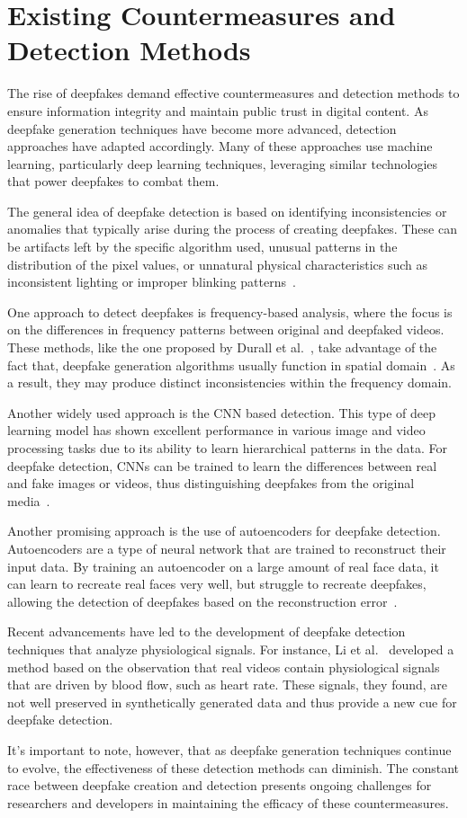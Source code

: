 \section{Existing Countermeasures and Detection Methods}\label{chapter:countermeasures}
The rise of deepfakes demand effective countermeasures and detection methods
to ensure information integrity and maintain public trust
in digital content. As deepfake generation techniques have become more advanced,
detection approaches have adapted accordingly. Many of these
approaches use machine learning, particularly deep learning techniques,
leveraging similar technologies that power deepfakes to combat them.

The general idea of deepfake detection is based on identifying inconsistencies
or anomalies that typically arise during the process of creating deepfakes. These
can be artifacts left by the specific algorithm used, unusual patterns in the
distribution of the pixel values, or unnatural physical characteristics
such as inconsistent lighting or improper blinking patterns~\cite{Agarwal_2019_CVPR_Workshops}.

One approach to detect deepfakes is frequency-based analysis, where the focus is
on the differences in frequency patterns between original and deepfaked videos.
These methods, like the one proposed by Durall et al.~\cite{durall2020unmasking},
take advantage of the fact that, deepfake generation algorithms usually function in
spatial domain~\cite{spatial-domain}. As a result, they may produce distinct inconsistencies
within the frequency domain.

Another widely used approach is the \ac{CNN} based detection. This type of deep
learning model has shown excellent performance in various image and video
processing tasks due to its ability to learn hierarchical patterns in the data.
For deepfake detection, \ac{CNN}s can be trained to learn the differences between
real and fake images or videos, thus distinguishing deepfakes from the original
media~\cite{nguyen2018capsuleforensics}.

Another promising approach is the use of autoencoders for deepfake detection.
Autoencoders are a type of neural network that are trained to reconstruct
their input data. By training an autoencoder on a large amount of real face
data, it can learn to recreate real faces very well, but struggle to recreate
deepfakes, allowing the detection of deepfakes based on the reconstruction
error~\cite{cozzolino2017recasting}.

Recent advancements have led to the development of deepfake detection techniques
that analyze physiological signals. For instance, Li et al.~\cite{li2018ictu}
developed a method based on the observation that real videos contain physiological
signals that are driven by blood flow, such as heart rate. These signals, they
found, are not well preserved in synthetically generated data and thus provide
a new cue for deepfake detection.

It's important to note, however, that as deepfake generation techniques
continue to evolve, the effectiveness of these detection methods can diminish.
The constant race between deepfake creation and detection presents ongoing
challenges for researchers and developers in maintaining the efficacy of these
countermeasures.